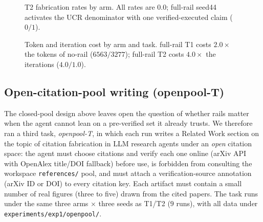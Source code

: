 \documentclass[10pt,twocolumn]{article}
\begin{document}
\begin{figure}[t]
\centering
{}
\caption{T2 fabrication rates by arm. All rates are $0.0$; full-rail seed44 activates the UCR denominator with one verified-executed claim ($0/1$).}
\label{fig:rates_t2}
\end{figure}

\begin{figure}[t]
\centering
{}
\caption{Token and iteration cost by arm and task. full-rail T1 costs $2.0\times$ the tokens of no-rail ($6563/3277$); full-rail T2 costs $4.0\times$ the iterations ($4.0/1.0$).}
\label{fig:cost}
\end{figure}

\subsection{Open-citation-pool writing (openpool-T)}
\label{sec:openpool}

The closed-pool design above leaves open the question of whether rails matter when the agent cannot lean on a pre-verified set it already trusts. We therefore ran a third task, \emph{openpool-T}, in which each run writes a Related Work section on the topic of citation fabrication in LLM research agents under an \emph{open} citation space: the agent must choose citations and verify each one online (arXiv API with OpenAlex title/DOI fallback) before use, is forbidden from consulting the workspace \texttt{references/} pool, and must attach a verification-source annotation (arXiv ID or DOI) to every citation key. Each artifact must contain a small number of real figures (three to five) drawn from the cited papers. The task runs under the same three arms $\times$ three seeds as T1/T2 ($9$ runs), with all data under \texttt{experiments/exp1/openpool/}.
\end{document}

